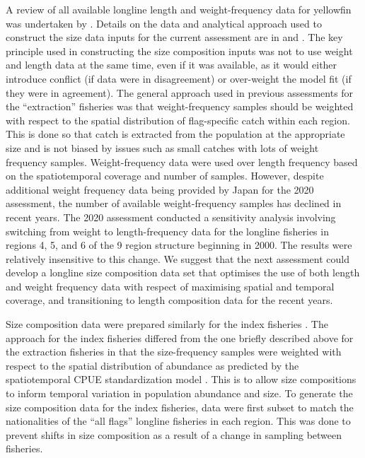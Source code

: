 A review of all available longline length and weight-frequency data for yellowfin was undertaken by \citet{mckechnie_analysis_2014}. Details on the data and analytical approach used to construct the size data inputs for the current assessment are in \citet{peatman_analysis_2023} and \citet{teears_cpue_2023}. The key principle used in constructing the size composition inputs was not to use weight and length data at the same time, even if it was available, as it would either introduce conflict (if data were in disagreement) or over-weight the model fit (if they were in agreement). The general approach used in previous assessments for the \enquote{extraction} fisheries was that weight-frequency samples should be weighted with respect to the spatial distribution of flag-specific catch within each region. This is done so that catch is extracted from the population at the appropriate size and is not biased by issues such as small catches with lots of weight frequency samples. Weight-frequency data were used over length frequency based on the spatiotemporal coverage and number of samples. However, despite additional weight frequency data being provided by Japan for the 2020 assessment, the number of available weight-frequency samples has declined in recent years. The 2020 assessment conducted a sensitivity analysis involving switching from weight to length-frequency data for the longline fisheries in regions 4, 5, and 6 of the 9 region structure beginning in 2000. The results were relatively insensitive to this change. We suggest that the next assessment could develop a longline size composition data set that optimises the use of both length and weight frequency data with respect of maximising spatial and temporal coverage, and transitioning to length composition data for the recent years.

Size composition data were prepared similarly for the index fisheries \citep{peatman_analysis_2023}. The approach for the index fisheries differed from the one briefly described above for the extraction fisheries in that the size-frequency samples were weighted with respect to the spatial distribution of abundance as predicted by the spatiotemporal CPUE standardization model \citep{teears_cpue_2023}. This is to allow size compositions to inform temporal variation in population abundance and size. To generate the size composition data for the index fisheries, data were first subset to match the nationalities of the \enquote{all flags} longline fisheries in each region. This was done to prevent shifts in size composition as a result of a change in sampling between fisheries.

